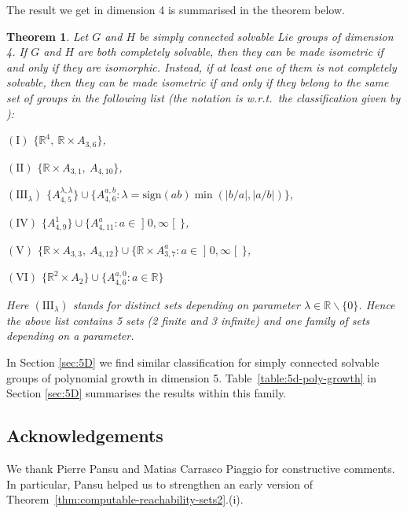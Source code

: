 \documentclass[a4paper,12pt]{amsart}
\newcommand{\pp}{\mathrm}
\newcommand{\vali}[1]{\mathopen{]} #1 \mathclose{[}}
\newcommand{\puna}[1]{{\color{red}#1}}
\newcommand{\pois}{\backslash}
\newcounter{listoja_varten}
\newenvironment{lista}%
{	\begin{list}{(\roman{listoja_varten})}{\usecounter{listoja_varten}}	}%
	{	\end{list}				}
\theoremstyle{plain}
\theoremstyle{definition}
\theoremstyle{plain}
\newtheorem{lausea}{Theorem}
\theoremstyle{remark}
\begin{document}
The result we get in dimension 4 is summarised in the theorem below. 

\begin{lausea} \label{thm:4D-classification_intro}
	Let \( G \) and \( H \) be simply connected solvable Lie groups of dimension 4. 
	If \( G \) and \( H \) are both completely solvable, then they can be made isometric if and only if they are isomorphic. Instead, if at least one of them is not completely solvable, then they can be made isometric if and only if they belong to the same set of groups in the following list (the notation is w.r.t.\ the classification given by \cite{avain:Patera}):
	\begin{lista}
		\item[\( (\pp{I}) \)] \( \{  \mathbb{R}^4,\: \mathbb{R} \times A_{3,6}  \} \),
		\item[\( (\pp{II}) \)] \( \{  \mathbb{R} \times A_{3,1},\: A_{4,10} \} \),
		\item[\( (\pp{III}_{\lambda}) \)] \( \{ A_{4,5}^{\lambda,\lambda} \} \cup \{ A_{4,6}^{a,b} : \lambda = \mathrm{sign}(ab) \min(|b/a|,|a/b|) \} \),
		\item[\( (\pp{IV}) \)]  \( \{ A_{4,9}^1\} \cup \{A_{4,11}^{a} : a \in \vali{0,\infty}\, \}\),
		\item[\( (\pp{V}) \)] \( \{\mathbb{R} \times A_{3,3},\: A_{4,12} \} \cup \{ \mathbb{R} \times A_{3,7}^a  : a \in \vali{0,\infty}\, \}\),
		\item[\( (\pp{VI}) \)] \(  \{ \mathbb{R}^2 \times  A_2\} \cup \{ A_{4,6}^{a,0} : a \in \mathbb{R} \} \)
	\end{lista}
Here \( (\pp{III}_{\lambda}) \) stands for distinct sets depending on parameter \( \lambda \in \mathbb{R} \pois \{0\} \). Hence the above list contains 5 sets (2 finite and 3 infinite) and one family of sets depending on a parameter.
\end{lausea}
In Section \ref{sec:5D} we find %
 similar classification for simply connected solvable groups of polynomial growth in dimension 5. Table~\ref{table:5d-poly-growth} in Section \ref{sec:5D} summarises the results within this family. 


\subsection*{Acknowledgements}
We thank Pierre Pansu and Matias Carrasco Piaggio for constructive comments. %
In particular, Pansu helped us to strengthen an early version of
 Theorem~\ref{thm:computable-reachability-sets2}.(i).
\end{document}
